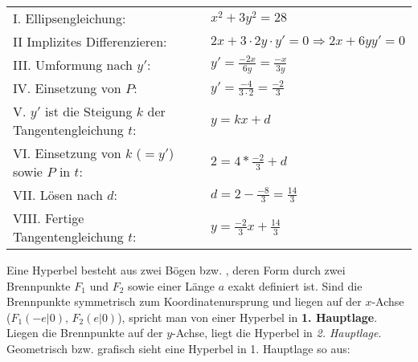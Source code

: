 { \renewcommand{\arraystretch}{2}

\begin{tabular}{l l}
	I. Ellipsengleichung: & $x^2 + 3y^2 = 28$
	\\
	II Implizites Differenzieren: & $2x + 3 \cdot{} 2y \cdot{} y' = 0 \Rightarrow 2x + 6yy' = 0$
	\\
	III. Umformung nach $y'$: & $y' = \frac{-2x}{6y} = \frac{-x}{3y}$
	\\
	IV. Einsetzung von $P$: & $y' = \frac{-4}{3 \cdot{} 2} = \frac{-2}{3}$
	\\
	V. $y'$ ist die Steigung $k$ der Tangentengleichung $t$: & $y = kx + d$
	\\
	VI. Einsetzung von $k$ ($ = y'$) sowie $P$ in $t$: & $2 = 4 * \frac{-2}{3} + d$
	\\
	VII. L\"{o}sen nach $d$: & $d = 2 - \frac{-8}{3} = \frac{14}{3}$
	\\
	VIII. Fertige Tangentengleichung $t$: & $y = \frac{-2}{3}x + \frac{14}{3}$
\end{tabular}

} %

\pagebreak


Eine Hyperbel besteht aus zwei B\"{o}gen bzw. , deren Form durch zwei Brennpunkte $F_{1}$ und $F_{2}$ sowie einer L\"{a}nge $a$ exakt definiert ist. Sind die Brennpunkte symmetrisch zum Koordinatenursprung und liegen auf der $x$-Achse ($F_{1} (-e | 0),\, F_{2} (e | 0)$), spricht man von einer Hyperbel in \textbf{1. Hauptlage}. Liegen die Brennpunkte auf der $y$-Achse, liegt die Hyperbel in \emph{2. Hauptlage}. Geometrisch bzw. grafisch sieht eine Hyperbel in 1. Hauptlage so aus:


